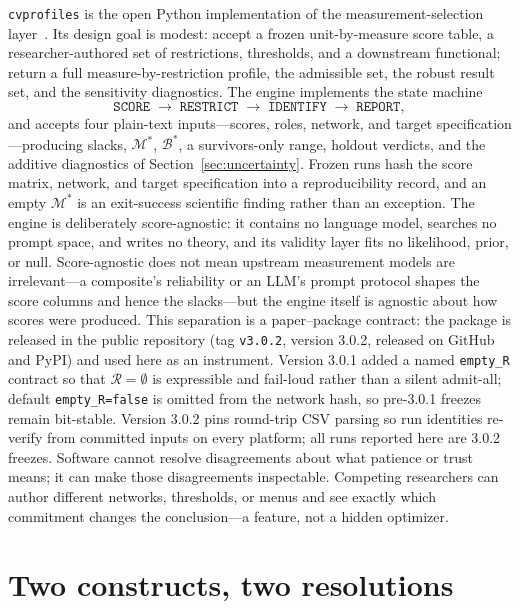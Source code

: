 \documentclass[10pt,letterpaper]{article}
\newcommand{\cvp}{\texttt{cvprofiles}}
\newcommand{\M}{\ensuremath{\mathcal{M}}}
\newcommand{\Rset}{\mathcal{R}}
\newcommand{\Bset}{\mathcal{B}}
\begin{document}
\cvp{} is the open Python implementation of the measurement-selection layer~\cite{cvprofiles}.
Its design goal is modest: accept a frozen unit-by-measure score table, a researcher-authored set of restrictions, thresholds, and a downstream functional; return a full measure-by-restriction profile, the admissible set, the robust result set, and the sensitivity diagnostics.
The engine implements the state machine
\begin{equation}
\texttt{SCORE} \;\longrightarrow\; \texttt{RESTRICT} \;\longrightarrow\; \texttt{IDENTIFY} \;\longrightarrow\; \texttt{REPORT},
\label{eq:statemachine}
\end{equation}
and accepts four plain-text inputs---scores, roles, network, and target specification---producing slacks, $\M^*$, $\Bset^*$, a survivors-only range, holdout verdicts, and the additive diagnostics of Section~\ref{sec:uncertainty}.
Frozen runs hash the score matrix, network, and target specification into a reproducibility record, and an empty $\M^*$ is an exit-success scientific finding rather than an exception.
The engine is deliberately score-agnostic: it contains no language model, searches no prompt space, and writes no theory, and its validity layer fits no likelihood, prior, or null.
Score-agnostic does not mean upstream measurement models are irrelevant---a composite's reliability or an LLM's prompt protocol shapes the score columns and hence the slacks---but the engine itself is agnostic about how scores were produced.
This separation is a paper--package contract: the package is released in the public repository (tag \texttt{v3.0.2}, version 3.0.2, released on GitHub and PyPI) and used here as an instrument.
Version 3.0.1 added a named \texttt{empty\_R} contract so that $\Rset=\emptyset$ is expressible and fail-loud rather than a silent admit-all; default \texttt{empty\_R=false} is omitted from the network hash, so pre-3.0.1 freezes remain bit-stable.
Version 3.0.2 pins round-trip CSV parsing so run identities re-verify from committed inputs on every platform; all runs reported here are 3.0.2 freezes.
Software cannot resolve disagreements about what patience or trust means; it can make those disagreements inspectable.
Competing researchers can author different networks, thresholds, or menus and see exactly which commitment changes the conclusion---a feature, not a hidden optimizer.

\section{Two constructs, two resolutions}
\label{sec:app}
\end{document}
